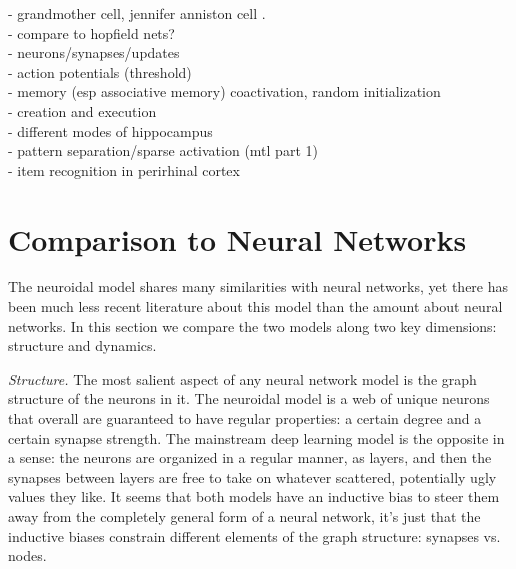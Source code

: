 \documentclass[letterpaper, 12pt]{article}
\begin{document}
- grandmother cell,  jennifer anniston cell \cite{quiroga_invariant_2005}.\\
- compare to hopfield nets?\\
- neurons/synapses/updates\\
- action potentials (threshold)\\
- memory (esp associative memory) coactivation, random initialization\\
- creation and execution\\
	- different modes of hippocampus\\

- pattern separation/sparse activation (mtl part 1)\\
- item recognition in perirhinal cortex %

\section{Comparison to Neural Networks}
The neuroidal model shares many similarities with neural networks, yet there has been much less recent literature about this model than the amount about neural networks. In this section we compare the two models along two key dimensions: structure and dynamics. 

{\it Structure.} The most salient aspect of any neural network model is the graph structure of the neurons in it. The neuroidal model is a web of unique neurons that overall are guaranteed to have regular properties: a certain degree and a certain synapse strength. The mainstream deep learning model is the opposite in a sense: the neurons are organized in a regular manner, as layers, and then the synapses between layers are free to take on whatever scattered, potentially ugly values they like. It seems that both models have an inductive bias to steer them away from the completely general form of a neural network, it's just that the inductive biases constrain different elements of the graph structure: synapses vs. nodes.
\end{document}
